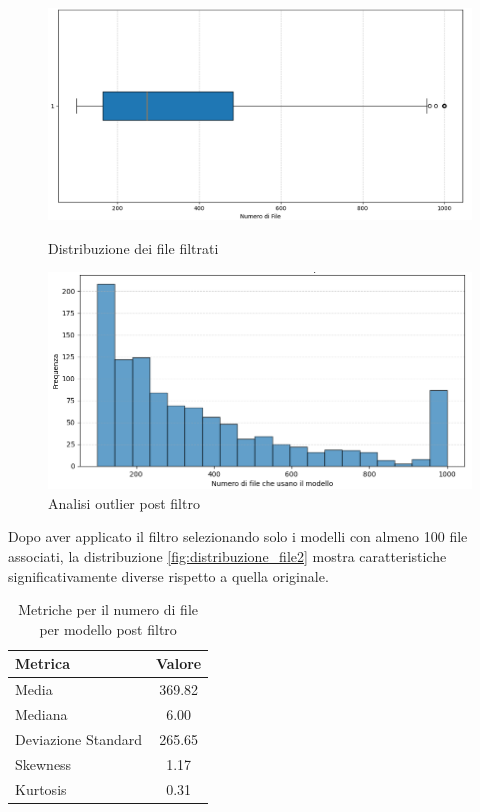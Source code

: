 \documentclass{article}
\begin{document}
\begin{figure}[h]
    \centering
    \begin{minipage}{0.45\textwidth}
        \centering
        \includegraphics[width=\linewidth]{images/approccio3.png}
        \caption{Distribuzione dei file filtrati}
        \label{fig:distribuzione_file2}
    \end{minipage}
    \hfill
    \begin{minipage}{0.45\textwidth}
        \centering
        \includegraphics[width=\linewidth]{images/approccio4.png}
        \caption{Analisi outlier post filtro}
        \label{fig:outlier_file2}
    \end{minipage}
\end{figure}
Dopo aver applicato il filtro selezionando solo i modelli con almeno 100 file associati, la distribuzione \ref{fig:distribuzione_file2} mostra caratteristiche significativamente diverse rispetto a quella originale.\\
\begin{table}[h]
    \centering
    \begin{tabular}{|l|c|}
        \hline
        \textbf{Metrica} & \textbf{Valore} \\
        \hline
        Media & 369.82 \\
        Mediana & 6.00 \\
        Deviazione Standard & 265.65 \\
        Skewness & 1.17 \\
        Kurtosis & 0.31 \\
        \hline
    \end{tabular}
    \caption{Metriche per il numero di file per modello post filtro}
    \label{tab:metriche_file_modello2}
\end{table}\\
\end{document}
